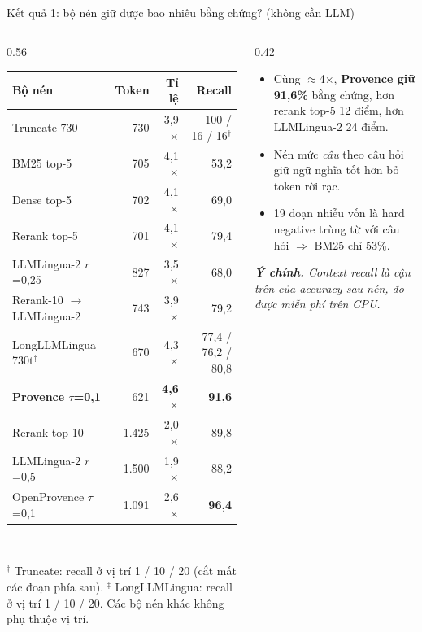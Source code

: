 \documentclass[aspectratio=169,11pt]{beamer}
\newcommand{\best}[1]{\textbf{\color{hustred}#1}}
\newcommand{\takeaway}[1]{{\footnotesize\itshape\color{hustdark}\textbf{Ý chính.} #1\par}}
\begin{document}
\begin{frame}{Kết quả 1: bộ nén giữ được bao nhiêu bằng chứng? (không cần LLM)}
  \begin{columns}[T]
    \begin{column}{0.56\textwidth}
      {\scriptsize
      \renewcommand{\arraystretch}{1.12}
      \begin{tabularx}{\textwidth}{@{}X r r r@{}}
      \toprule
      \textbf{\color{hustred}Bộ nén} & \textbf{\color{hustred}Token} &
      \textbf{\color{hustred}Tỉ lệ} & \textbf{\color{hustred}Recall} \\
      \midrule
      Truncate 730           & 730  & 3,9$\times$ & 100 / 16 / 16$^\dagger$ \\
      BM25 top-5             & 705  & 4,1$\times$ & 53,2 \\
      Dense top-5            & 702  & 4,1$\times$ & 69,0 \\
      Rerank top-5           & 701  & 4,1$\times$ & 79,4 \\
      LLMLingua-2 $r$=0,25   & 827  & 3,5$\times$ & 68,0 \\
      Rerank-10 $\to$ LLMLingua-2 & 743 & 3,9$\times$ & 79,2 \\
      LongLLMLingua 730t$^\ddagger$ & 670 & 4,3$\times$ & 77,4 / 76,2 / 80,8 \\
      \textbf{Provence $\tau$=0,1} & 621 & \textbf{4,6$\times$} & \best{91,6} \\
      \midrule
      Rerank top-10          & 1.425 & 2,0$\times$ & 89,8 \\
      LLMLingua-2 $r$=0,5    & 1.500 & 1,9$\times$ & 88,2 \\
      OpenProvence $\tau$=0,1 & 1.091 & 2,6$\times$ & \best{96,4} \\
      \bottomrule
      \end{tabularx}}\\[0.3em]
      {\tiny $^\dagger$ Truncate: recall ở vị trí 1 / 10 / 20 (cắt mất các đoạn phía sau).
      $^\ddagger$ LongLLMLingua: recall ở vị trí 1 / 10 / 20. Các bộ nén khác không phụ thuộc vị trí.\par}
    \end{column}
    \begin{column}{0.42\textwidth}
      \small
      \begin{itemize}\setlength\itemsep{0.4em}
        \item Cùng $\approx$4$\times$, \textbf{Provence giữ 91,6\%} bằng chứng, hơn
          rerank top-5 12 điểm, hơn LLMLingua-2 24 điểm.
        \item Nén mức \emph{câu} theo câu hỏi giữ ngữ nghĩa tốt hơn bỏ token rời rạc.
        \item 19 đoạn nhiễu vốn là hard negative trùng từ với câu hỏi $\Rightarrow$ BM25 chỉ 53\%.
      \end{itemize}
      \vfill
      \takeaway{Context recall là cận trên của accuracy sau nén, đo được miễn phí trên CPU.}
    \end{column}
  \end{columns}
\end{frame}
\end{document}
